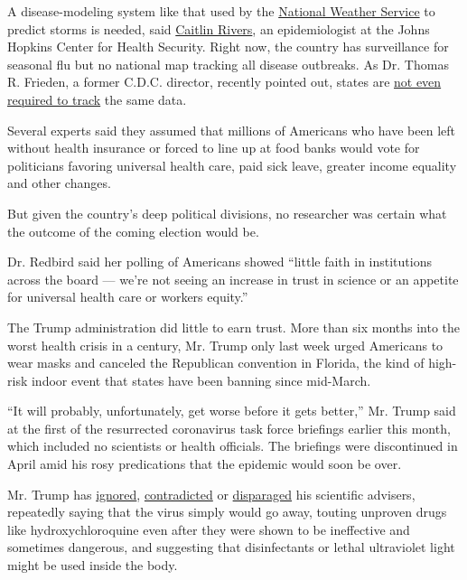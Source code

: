 A disease-modeling system like that used by the
\href{https://www.weather.gov/}{National Weather Service} to predict
storms is needed, said
\href{https://www.centerforhealthsecurity.org/our-people/rivers/}{Caitlin
Rivers}, an epidemiologist at the Johns Hopkins Center for Health
Security. Right now, the country has surveillance for seasonal flu but
no national map tracking all disease outbreaks. As Dr. Thomas R.
Frieden, a former C.D.C. director, recently pointed out, states are
\href{https://www.nytimes3xbfgragh.onion/2020/07/21/health/coronavirus-data-states-cdc.html}{not
even required to track} the same data.

Several experts said they assumed that millions of Americans who have
been left without health insurance or forced to line up at food banks
would vote for politicians favoring universal health care, paid sick
leave, greater income equality and other changes.

But given the country's deep political divisions, no researcher was
certain what the outcome of the coming election would be.

Dr. Redbird said her polling of Americans showed ``little faith in
institutions across the board --- we're not seeing an increase in trust
in science or an appetite for universal health care or workers equity.''

The Trump administration did little to earn trust. More than six months
into the worst health crisis in a century, Mr. Trump only last week
urged Americans to wear masks and canceled the Republican convention in
Florida, the kind of high-risk indoor event that states have been
banning since mid-March.

``It will probably, unfortunately, get worse before it gets better,''
Mr. Trump said at the first of the resurrected coronavirus task force
briefings earlier this month, which included no scientists or health
officials. The briefings were discontinued in April amid his rosy
predications that the epidemic would soon be over.

Mr. Trump has
\href{https://www.nytimes3xbfgragh.onion/2020/03/23/us/politics/coronavirus-trump-fauci.html}{ignored},
\href{https://www.youtube.com/watch?v=yYhriqvJMSw}{contradicted} or
\href{https://www.cnn.com/2020/07/19/politics/trump-fauci-alarmist-coronavirus/index.html}{disparaged}
his scientific advisers, repeatedly saying that the virus simply would
go away, touting unproven drugs like hydroxychloroquine even after they
were shown to be ineffective and sometimes dangerous, and suggesting
that disinfectants or lethal ultraviolet light might be used inside the
body.

